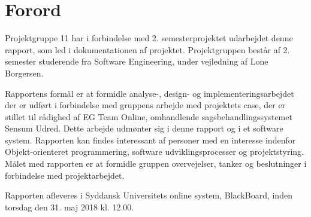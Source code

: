 \documentclass[../main.tex]{subfiles}
\begin{document}
\section*{Forord}
Projektgruppe 11 har i forbindelse med 2. semesterprojektet udarbejdet denne rapport, som led i dokumentationen af projektet. Projektgruppen består af 2. semester studerende fra Software Engineering, under vejledning af Lone Borgersen.

Rapportens formål er at formidle analyse-, design- og implementeringsarbejdet der er udført i forbindelse med gruppens arbejde med projektets case, der er stillet til rådighed af EG Team Online, omhandlende sagsbehandlingssystemet Sensum Udred. Dette arbejde udmønter sig i denne rapport og i et software system. Rapporten kan findes interessant af personer med en interesse indenfor Objekt-orienteret programmering, software udviklingsprocesser og projektstyring. Målet med rapporten er at formidle gruppen overvejelser, tanker og beslutninger i forbindelse med projektarbejdet.

Rapporten afleveres i Syddansk Universitets online system, BlackBoard, inden torsdag den 31. maj 2018 kl. 12.00.
\end{document}
